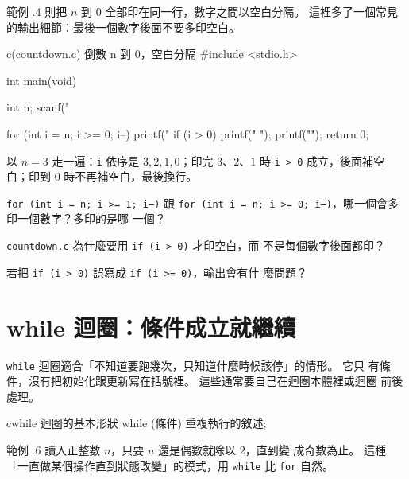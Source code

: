 範例 \thechapter.4 則把 $n$ 到 $0$ 全部印在同一行，數字之間以空白分隔。 
這裡多了一個常見的輸出細節：最後一個數字後面不要多印空白。

\begin{example}{c}{(countdown.c) 倒數 n 到 0，空白分隔}
#include <stdio.h>

int main(void) {
    int n;
    scanf("%

    for (int i = n; i >= 0; i--) {
        printf("%
        if (i > 0) {
            printf(" ");
        }
    }
    printf("\n");
    return 0;
}
\end{example}


以 $n = 3$ 走一遍：\texttt{i} 依序是 $3, 2, 1, 0$；印完 $3$、$2$、$1$ 時
\texttt{i > 0} 成立，後面補空白；印到 $0$ 時不再補空白，最後換行。


\begin{drills}[label=drills:loop-countdown]
\item \texttt{for (int i = n; i >= 1; i--)} 跟
\texttt{for (int i = n; i >= 0; i--)}，哪一個會多印一個數字？多印的是哪
一個？
\item \texttt{countdown.c} 為什麼要用 \texttt{if (i > 0)} 才印空白，而
不是每個數字後面都印？
\item 若把 \texttt{if (i > 0)} 誤寫成 \texttt{if (i >= 0)}，輸出會有什
麼問題？
\end{drills}

\section{while 迴圈：條件成立就繼續}
\label{sec:loop-while-basics}

\texttt{while} 迴圈適合「不知道要跑幾次，只知道什麼時候該停」的情形。 它只
有條件，沒有把初始化跟更新寫在括號裡。 這些通常要自己在迴圈本體裡或迴圈
前後處理。

\begin{code}{c}{while 迴圈的基本形狀}
while (條件) {
    重複執行的敘述;
}
\end{code}

範例 \thechapter.6 讀入正整數 $n$，只要 $n$ 還是偶數就除以 $2$，直到變
成奇數為止。 這種「一直做某個操作直到狀態改變」的模式，用 \texttt{while}
比 \texttt{for} 自然。


